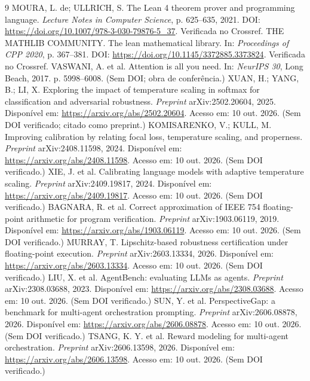 \begin{thebibliography}{9}
 MOURA, L. de; ULLRICH, S. The Lean 4 theorem prover and programming language. \textit{Lecture Notes in Computer Science}, p. 625--635, 2021. DOI: \url{https://doi.org/10.1007/978-3-030-79876-5_37}. Verificada no Crossref.
 THE MATHLIB COMMUNITY. The lean mathematical library. In: \textit{Proceedings of CPP 2020}, p. 367--381. DOI: \url{https://doi.org/10.1145/3372885.3373824}. Verificada no Crossref.
 VASWANI, A. et al. Attention is all you need. In: \textit{NeurIPS 30}, Long Beach, 2017. p. 5998--6008. (Sem DOI; obra de conferência.)
 XUAN, H.; YANG, B.; LI, X. Exploring the impact of temperature scaling in softmax for classification and adversarial robustness. \textit{Preprint} arXiv:2502.20604, 2025. Disponível em: \url{https://arxiv.org/abs/2502.20604}. Acesso em: 10 out. 2026. (Sem DOI verificado; citado como preprint.)
 KOMISARENKO, V.; KULL, M. Improving calibration by relating focal loss, temperature scaling, and properness. \textit{Preprint} arXiv:2408.11598, 2024. Disponível em: \url{https://arxiv.org/abs/2408.11598}. Acesso em: 10 out. 2026. (Sem DOI verificado.)
 XIE, J. et al. Calibrating language models with adaptive temperature scaling. \textit{Preprint} arXiv:2409.19817, 2024. Disponível em: \url{https://arxiv.org/abs/2409.19817}. Acesso em: 10 out. 2026. (Sem DOI verificado.)
 BAGNARA, R. et al. Correct approximation of IEEE 754 floating-point arithmetic for program verification. \textit{Preprint} arXiv:1903.06119, 2019. Disponível em: \url{https://arxiv.org/abs/1903.06119}. Acesso em: 10 out. 2026. (Sem DOI verificado.)
 MURRAY, T. Lipschitz-based robustness certification under floating-point execution. \textit{Preprint} arXiv:2603.13334, 2026. Disponível em: \url{https://arxiv.org/abs/2603.13334}. Acesso em: 10 out. 2026. (Sem DOI verificado.)
 LIU, X. et al. AgentBench: evaluating LLMs as agents. \textit{Preprint} arXiv:2308.03688, 2023. Disponível em: \url{https://arxiv.org/abs/2308.03688}. Acesso em: 10 out. 2026. (Sem DOI verificado.)
 SUN, Y. et al. PerspectiveGap: a benchmark for multi-agent orchestration prompting. \textit{Preprint} arXiv:2606.08878, 2026. Disponível em: \url{https://arxiv.org/abs/2606.08878}. Acesso em: 10 out. 2026. (Sem DOI verificado.)
 TSANG, K. Y. et al. Reward modeling for multi-agent orchestration. \textit{Preprint} arXiv:2606.13598, 2026. Disponível em: \url{https://arxiv.org/abs/2606.13598}. Acesso em: 10 out. 2026. (Sem DOI verificado.)

\end{thebibliography}

